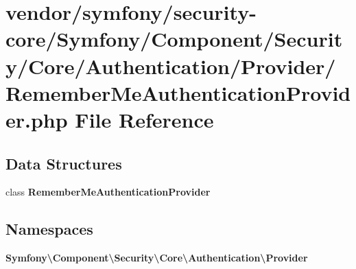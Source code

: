 \section{vendor/symfony/security-\/core/\+Symfony/\+Component/\+Security/\+Core/\+Authentication/\+Provider/\+Remember\+Me\+Authentication\+Provider.php File Reference}
\label{_remember_me_authentication_provider_8php}
\subsection*{Data Structures}
\begin{DoxyCompactItemize}
\item 
class {\bf Remember\+Me\+Authentication\+Provider}
\end{DoxyCompactItemize}
\subsection*{Namespaces}
\begin{DoxyCompactItemize}
\item 
 {\bf Symfony\textbackslash{}\+Component\textbackslash{}\+Security\textbackslash{}\+Core\textbackslash{}\+Authentication\textbackslash{}\+Provider}
\end{DoxyCompactItemize}
